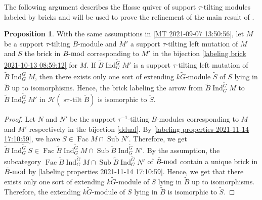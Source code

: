 \documentclass[pdftex,a4paper]{article}
\numberwithin{equation}{subsection}
\theoremstyle{definition}
\newtheorem{proposition}[theorem]{Proposition}
\newcommand{\lmod}{\operatorname{\mathrm{\hspace{-2pt}-mod}}}
\newcommand{\induc}{{\operatorname{Ind}\nolimits}}
\newcommand{\stautilt}{\operatorname{\mathrm{s\tau-tilt}}}
\newcommand{\Fac}{\operatorname{\mathrm{Fac}}}
\newcommand{\Sub}{\operatorname{\mathrm{Sub}}}
\begin{document}
The following argument describes the Hasse quiver of support \(\tau\)-tilting modules labeled by bricks and will be used to prove the refinement of the main result of \cite{MR4243358}.
\begin{proposition}\label{label brick 2021-10-03 22:08:25}
	With the same assumptions in \cref{MT 2021-09-07 13:50:56},
	let \(M\) be a support \(\tau\)-tilting \(B\)-module and \(M'\) a support \(\tau\)-tilting left mutation of \(M\) and \(S\) the brick in \(B\lmod\) corresponding to \(M'\) in the bijection \eqref{labeling brick 2021-10-13 08:59:12} for \(M\).
	If \(\tilde{B}\induc_G^{\tilde{G}}M'\) is a support \(\tau\)-tilting left mutation of \(\tilde{B}\induc_G^{\tilde{G}}M\), then there exists only one sort of extending \(k\tilde{G}\)-module \(\tilde{S}\) of \(S\) lying in \(\tilde{B}\) up to isomorphisms.
	Hence, the brick labeling the arrow from \(\tilde{B}\induc_G^{\tilde{G}}M\) to \(\tilde{B}\induc_G^{\tilde{G}}M'\) in \(\mathcal{H}(\stautilt \tilde{B})\) is isomorphic to \(\tilde{S}\).
\end{proposition}
\begin{proof}
	Let \(N\) and \(N'\) be the support \(\tau^{-1}\)-tilting \(B\)-modules corresponding to \(M\) and \(M'\) respectively in the bijection \eqref{ddual}.
	By \cref{labeling properties 2021-11-14 17:10:59}, we have \(S \in \Fac M \cap \Sub N'\).
	Therefore, we get \(\tilde{B}\induc_G^{\tilde{G}}S \in \Fac \tilde{B}\induc_G^{\tilde{G}} M \cap \Sub \tilde{B}\induc_G^{\tilde{G}} N'\).
	By the assumption, the subcategory \(\Fac \tilde{B}\induc_G^{\tilde{G}} M \cap \Sub \tilde{B}\induc_G^{\tilde{G}} N'\) of \(\tilde{B}\lmod\) contain a unique brick in \(\tilde{B}\lmod\) by \cref{labeling properties 2021-11-14 17:10:59}.
	Hence, we get that there exists only one sort of extending \(k\tilde{G}\)-module of \(S\) lying in \(\tilde{B}\) up to isomorphisms.
	Therefore, the extending \(k\tilde{G}\)-module of \(S\) lying in \(\tilde{B}\) is isomorphic to \(\tilde{S}\).
\end{proof}
\end{document}

